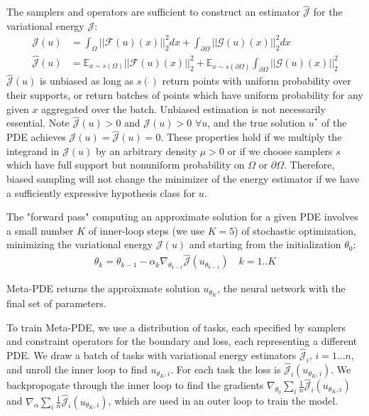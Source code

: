 The samplers and operators are sufficient to construct an estimator $\hat{\mathcal{J}}$ for the variational
energy $\mathcal{J}$:
\begin{align*}
  \mathcal{J}(u) &= \int_{\Omega} ||\mathcal{F}(u)(x)||^2_2 dx +
  \int_{\partial\Omega} ||\mathcal{G}(u)(x)||_2^2 dx \\
  \hat{\mathcal{J}}(u) &= \mathbb{E}_{x \sim s(\Omega)} ||\mathcal{F}(u)(x)||^2_2 +
  \mathbb{E}_{x \sim s(\partial \Omega)} \int_{\partial \Omega} ||\mathcal{G}(u)(x)||_2^2
\end{align*}
$\hat{\mathcal{J}}(u)$ is unbiased as long as $s(\dot{})$ return points with
uniform probability over their supports, or return batches of points which have uniform
probability for any given $x$ aggregated over the batch. Unbiased estimation is not
necessarily essential. Note $\hat{\mathcal{J}}(u) > 0$ and $\mathcal{J}(u) > 0$
$\forall u$, and the true solution $u^*$ of the PDE achieves
$\mathcal{J}(u) = \hat{\mathcal{J}}(u) = 0$. These properties hold if we multiply
the integrand in $\mathcal{J}(u)$ by an arbitrary density $\mu > 0$ or if we
choose samplers $s$ which have full support but nonuniform probability on $\Omega$
or $\partial \Omega$. Therefore, biased sampling will not change the minimizer of the
energy estimator if we have a sufficiently expressive hypothesis class for $u$.

The "forward pass" computing an approximate solution for a given PDE involves
a small number $K$ of inner-loop steps (we use $K=5$) of stochastic optimization,
minimizing the variational energy $\mathcal{J}(u)$ and starting from
the initialization $\theta_0$:
\begin{align*}
  \theta_k = \theta_{k-1} - \alpha_k \nabla_{\theta_{k-1}} \hat{\mathcal{J}}(u_{\theta_{k-1}}) \quad k = 1 .. K
\end{align*}

Meta-PDE returns the approixmate solution $u_{\theta_K}$, the neural network
with the final set of parameters.

To train Meta-PDE, we use a distribution of tasks, each specified by
samplers and constraint operators for the boundary and loss, each representing a
different PDE.
We draw a batch of tasks with variational energy estimators $\hat{\mathcal{J}}_i$,
$i = 1 ... n$, and unroll the inner loop to find $u_{\theta_K, i}$.
For each task the loss is $\hat{\mathcal{J}}_i(u_{\theta_K, i})$.
We backpropogate through the inner loop to find the gradients
$\nabla_{\theta_0} \sum_i \frac{1}{n} \hat{\mathcal{J}}_i(u_{\theta_K, i})$
and $\nabla_{\alpha} \sum_i \frac{1}{n} \hat{\mathcal{J}}_i(u_{\theta_K, i})$,
which are used in an outer loop to train the model.
